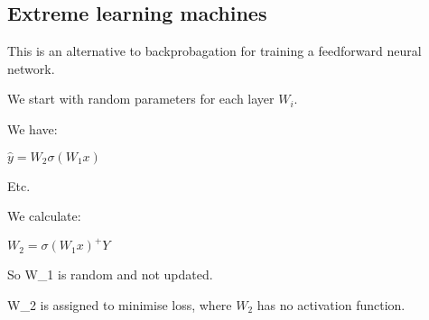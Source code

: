 
\subsection{Extreme learning machines}

This is an alternative to backprobagation for training a feedforward neural network.

We start with random parameters for each layer \(W_i\).

We have:

\(\hat y=W_2\sigma (W_1 x)\)

Etc.

We calculate:

\(W_2=\sigma(W_1x)^+Y\)

So W_1 is random and not updated.

W_2 is assigned to minimise loss, where \(W_2\) has no activation function.

